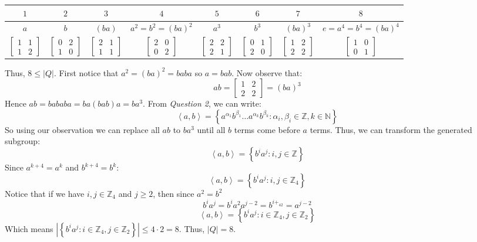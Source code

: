 \documentclass[a4paper, 11pt]{article}
\newcommand{\NN}{\mathbb{N}}
\newcommand{\ZZ}{\mathbb{Z}}
\def\set#1{\left\{ #1 \right\}}
\def\gen#1{\left\langle#1 \right\rangle}
\begin{document}
\begin{enumerate}[label=(\alph*)]
	\begin{center}
		\begin{tabular}{|c|c|c|c|c|c|c|c|}
			\toprule
			$1$ & $2$ & $3$ & $4$ & $5$ & $6$ & $7$ & $8$ \\
			\midrule 
			$a$ & 
			$b$ & 
			$(ba)$ & 
			$a^2=b^2=(ba)^2$ & 
			$a^3$ &
			$b^3$ &
			$(ba)^3$ &
			$e=a^4=b^4=(ba)^4$ \\
			\midrule 
			$\begin{bmatrix}
				1 & 1 \\ 
				1 & 2 
			\end{bmatrix}$&
			$\begin{bmatrix}
				0 & 2 \\ 
				1 & 0 
			\end{bmatrix}$&
			$\begin{bmatrix}
				2 & 1 \\ 
				1 & 1 
			\end{bmatrix}$&
			$\begin{bmatrix}
				2 & 0 \\ 
				0 & 2 
			\end{bmatrix}$&
			$\begin{bmatrix}
				2 & 2 \\ 
				2 & 1 
			\end{bmatrix}$&
			$\begin{bmatrix}
				0 & 1 \\ 
				2 & 0 
			\end{bmatrix}$&
			$\begin{bmatrix}
				1 & 2 \\ 
				2 & 2 
			\end{bmatrix}$&
			$\begin{bmatrix}
				1 & 0 \\ 
				0 & 1 
			\end{bmatrix}$
			\\
			\bottomrule
		\end{tabular}
	\end{center}

	Thus, $8\leq|Q|$. First notice that $a^2=(ba)^2=baba$ so $a=bab$. Now observe that: 
	\[
	 	ab = \begin{bmatrix}
			1 & 2 \\ 
			2 & 2
		\end{bmatrix} =(ba)^3	
	\]
	Hence $ab=bababa=ba(bab)a=ba^3$. From \textit{Question 2}, we can write: 
	\[
		\gen{a,b} = \set{
			a^{\alpha_1}b^{\beta_1}\dots 
			a^{\alpha_k}b^{\beta_k} : \alpha_i,\beta_i\in\ZZ, k\in\NN
		}	
	\]
	So using our observation we can replace all $ab$ to $ba^3$ until all $b$ terms come before $a$ terms. Thus, we can transform the generated subgroup: 
	\[
		\gen{a,b} =\set{b^ia^j: i,j\in\ZZ} 	
	\]
	Since $a^{k+4}=a^k$ and $b^{k+4}=b^k$:
	\[
		\gen{a,b}=\set{b^ia^j: i,j\in\ZZ_4} 	
	\]
	Notice that if we have $i,j\in\ZZ_4$ and $j\geq 2$, then since $a^2=b^2$
	\[
		b^ia^j = b^i a^2a^{j-2}	=b^{i+_42}=a^{j-2}
	\]
	\[
		\gen{a,b}=\set{b^ia^j: i\in\ZZ_4,j\in\ZZ_2} 	
	\]
	Which means $|\set{b^ia^j: i\in\ZZ_4,j\in\ZZ_2}|\leq 4\cdot 2 = 8$. Thus, $|Q|=8$. 






\end{enumerate}
\end{document}

